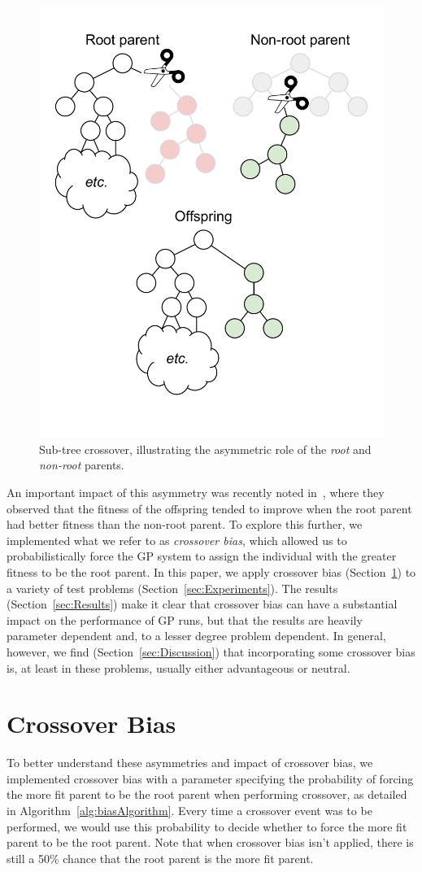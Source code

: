 \documentclass{sig-alternate}
\begin{document}
\begin{figure}
	\centering
	\includegraphics[width=0.45 \textwidth]{Plots/Root_parent_illustration_no_triangle.pdf}
	\caption{Sub-tree crossover, illustrating the asymmetric role of the \emph{root} and \emph{non-root} parents.}
	\label{fig:root_parent_illustration}
\end{figure}

An important impact of this asymmetry was recently noted in~\cite{McPheeDonatucciDramdahl:2014}, where they observed
that the fitness of the offspring tended to improve when the root parent had better fitness than the non-root parent.
To explore this further, we implemented what we refer to as \emph{crossover bias}, which allowed us to
probabilistically force the GP system to assign the individual with the greater fitness to be the root parent. In this
paper, we apply crossover bias (Section~\ref{sec:XObias}) to a variety of test problems
(Section~\ref{sec:Experiments}). The results (Section~\ref{sec:Results}) make it clear that crossover bias can have a
substantial impact on the performance of GP runs, but that the results are heavily parameter dependent and, to a lesser
degree problem dependent. In general, however, we find (Section~\ref{sec:Discussion}) that incorporating some crossover
bias is, at least in these problems, usually either advantageous or neutral. 

\section{Crossover Bias} \label{sec:XObias}

To better understand these asymmetries and impact of crossover bias, 
we implemented crossover bias with a parameter specifying the probability of forcing the more fit parent
to be the root parent when performing crossover, as detailed in Algorithm~\ref{alg:biasAlgorithm}. Every time a
crossover event was to be performed, we would use this probability to decide whether to force the more fit parent to be
the root parent. 
Note that when crossover bias isn't applied, there is still a 50\% chance that the root parent is the more fit
parent.
\end{document}
